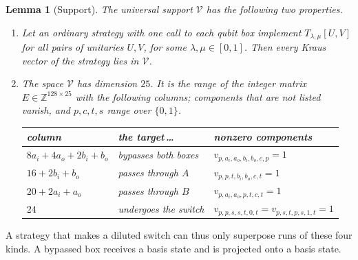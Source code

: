\documentclass[11pt,letterpaper]{article}
\newtheorem{lemma}[theorem]{Lemma}
\theoremstyle{definition}\newtheorem{definition}[theorem]{Definition}
\begin{document}
\begin{lemma}[Support]\label{lem:support}
The universal support $\mathcal V$ has the following two properties.
\begin{enumerate}
\item[\textup{(a)}] Let an ordinary strategy with one call to each
qubit box implement $T_{\lambda,\mu}[U,V]$ for all pairs of unitaries
$U,V$, for some $\lambda,\mu\in[0,1]$. Then every Kraus vector of the
strategy lies in $\mathcal V$.
\pagebreak[1]
\item[\textup{(b)}] The space $\mathcal V$ has dimension $25$. It is
the range of the integer matrix $E\in\mathbb Z^{128\times25}$ with the
following columns; components that are not listed vanish, and
$p,c,t,s$ range over $\{0,1\}$.
\begin{center}
\begin{tabular}{@{}lll@{}}
\toprule
column & the target\,\dots & nonzero components\\
\midrule
$8a_i+4a_o+2b_i+b_o$ & bypasses both boxes & $v_{p,a_i,a_o,b_i,b_o,c,p}=1$\\
$16+2b_i+b_o$ & passes through $A$ & $v_{p,p,t,b_i,b_o,c,t}=1$\\
$20+2a_i+a_o$ & passes through $B$ & $v_{p,a_i,a_o,p,t,c,t}=1$\\
$24$ & undergoes the switch & $v_{p,p,s,s,t,0,t}=v_{p,s,t,p,s,1,t}=1$\\
\bottomrule
\end{tabular}
\end{center}
\end{enumerate}
\end{lemma}

A strategy that makes a diluted switch can thus only superpose runs of
these four kinds. A bypassed box receives a basis state and is
projected onto a basis state.
\end{document}

